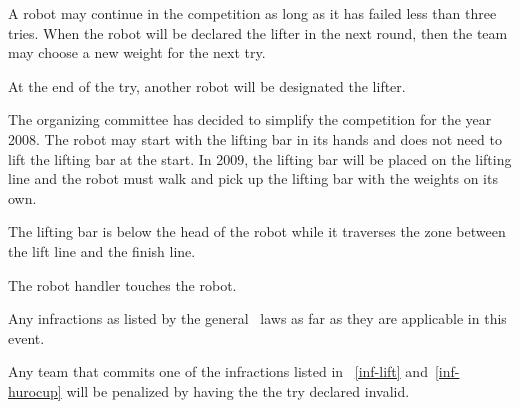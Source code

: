 \documentclass[12pt]{hurocup}
\begin{document}
\begin{lawlist}[WL]
\item A robot may continue in the competition as long as it has failed
 less than three tries. When the robot will be declared the lifter in
 the next round, then the team may choose a new weight for the next
 try. 

\item At the end of the try, another robot will be designated the
 lifter. 

\end{lawlist}

\begin{decisions}
\item The organizing committee has decided to simplify the competition
for the year 2008. The robot may start with the lifting bar in its
hands and does not need to lift the lifting bar at the start. In 2009,
the lifting bar will be placed on the lifting line and the robot must
walk and pick up the lifting bar with the weights on its own.
\end{decisions}


\begin{lawlist}[WL]
\item \label{inf-lift} The lifting bar is below the head of the robot
 while it traverses the zone between the lift line and the finish line.

\item \label{inf-handler} The robot handler touches the robot. 

\item \label{inf-hurocup} Any infractions as listed by the general
  \HuroCup\ laws as far as they are applicable in this event.

\item Any team that commits one of the infractions listed in
 ~\ref{inf-lift} and~\ref{inf-hurocup} will be penalized by having the
 the try declared invalid. 

\end{lawlist}

\end{document}
